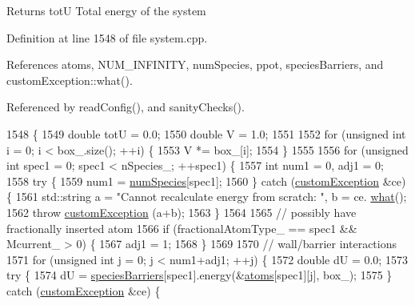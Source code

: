 \begin{DoxyReturn}{Returns}
tot\-U Total energy of the system 
\end{DoxyReturn}


Definition at line 1548 of file system.\-cpp.



References atoms, N\-U\-M\-\_\-\-I\-N\-F\-I\-N\-I\-T\-Y, num\-Species, ppot, species\-Barriers, and custom\-Exception\-::what().



Referenced by read\-Config(), and sanity\-Checks().


\begin{DoxyCode}
1548                                        \{
1549     \textcolor{keywordtype}{double} totU = 0.0;
1550     \textcolor{keywordtype}{double} V = 1.0;
1551 
1552     \textcolor{keywordflow}{for} (\textcolor{keywordtype}{unsigned} \textcolor{keywordtype}{int} i = 0; i < box\_.size(); ++i) \{
1553         V *= box\_[i];
1554     \}
1555 
1556     \textcolor{keywordflow}{for} (\textcolor{keywordtype}{unsigned} \textcolor{keywordtype}{int} spec1 = 0; spec1 < nSpecies\_; ++spec1) \{
1557         \textcolor{keywordtype}{int} num1 = 0, adj1 = 0;
1558         \textcolor{keywordflow}{try} \{
1559             num1 = \hyperlink{classsim_system_a9eea865e6dc1cff377b1e79c4d9c23f0}{numSpecies}[spec1];
1560         \} \textcolor{keywordflow}{catch} (\hyperlink{classcustom_exception}{customException} &ce) \{
1561             std::string a = \textcolor{stringliteral}{"Cannot recalculate energy from scratch: "}, b = ce.
      \hyperlink{classcustom_exception_aeb6ab5848b038adfc68fde86a512f691}{what}();
1562             \textcolor{keywordflow}{throw} \hyperlink{classcustom_exception}{customException} (a+b);
1563         \}
1564 
1565         \textcolor{comment}{// possibly have fractionally inserted atom}
1566         \textcolor{keywordflow}{if} (fractionalAtomType\_ == spec1 && Mcurrent\_ > 0) \{
1567             adj1 = 1;
1568         \}
1569 
1570         \textcolor{comment}{// wall/barrier interactions}
1571         \textcolor{keywordflow}{for} (\textcolor{keywordtype}{unsigned} \textcolor{keywordtype}{int} j = 0; j < num1+adj1; ++j) \{
1572             \textcolor{keywordtype}{double} dU = 0.0;
1573             \textcolor{keywordflow}{try} \{
1574                 dU = \hyperlink{classsim_system_a5ae652ff4519f39c3862abae32a9581b}{speciesBarriers}[spec1].energy(&\hyperlink{classsim_system_a90421b19082f7fb8fc23b7264b1161e4}{atoms}[spec1][j], box\_);
1575             \} \textcolor{keywordflow}{catch} (\hyperlink{classcustom_exception}{customException} &ce) \{

\end{DoxyCode}
